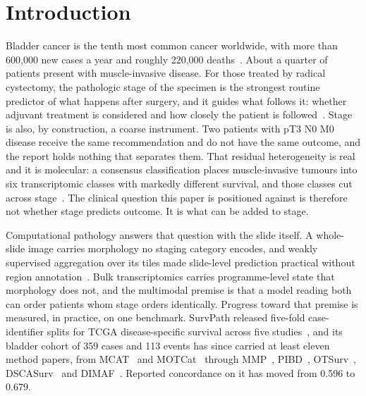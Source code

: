 \documentclass[unnumsec,webpdf,contemporary,large]{oup-authoring-template}
\begin{document}
\section{Introduction}
Bladder cancer is the tenth most common cancer worldwide, with more than 600,000 new cases a year
and roughly 220,000 deaths~\citep{bray2024globocan}. About a quarter of patients present with
muscle-invasive disease. For those treated by radical cystectomy, the pathologic stage of the
specimen is the strongest routine predictor of what happens after surgery, and it guides what
follows it: whether adjuvant treatment is considered and how closely the patient is
followed~\citep{witjes2021eau}. Stage is also, by construction, a
coarse instrument. Two patients with pT3 N0 M0 disease receive the same recommendation and do not
have the same outcome, and the report holds nothing that separates them. That residual
heterogeneity is real and it is molecular: a consensus classification places muscle-invasive
tumours into six transcriptomic classes with markedly different survival, and those classes cut
across stage~\citep{kamoun2020consensus, tcga2014blca}. The clinical question this paper is
positioned against is therefore not whether stage predicts outcome. It is what can be added to
stage.

Computational pathology answers that question with the slide itself. A whole-slide image carries
morphology no staging category encodes, and weakly supervised aggregation over its tiles made
slide-level prediction practical without region
annotation~\citep{lu2021clam, chen2024uni, ding2025titan}. Bulk transcriptomics carries
programme-level state that morphology does not, and the multimodal premise is that a model reading
both can order patients whom stage orders identically. Progress toward that premise is measured, in
practice, on one benchmark. SurvPath released five-fold case-identifier splits for TCGA
disease-specific survival across five studies~\citep{jaume2024survpath}, and its bladder cohort of
359 cases and 113 events has since carried at least eleven method papers, from
MCAT~\citep{chen2021mcat} and MOTCat~\citep{xu2023motcat} through MMP~\citep{song2024mmp},
PIBD~\citep{zhang2024pibd}, OTSurv~\citep{ren2025otsurv}, DSCASurv~\citep{song2025dscasurv} and
DIMAF~\citep{eijpe2025dimaf}. Reported concordance on it has moved from 0.596 to 0.679.
\end{document}
